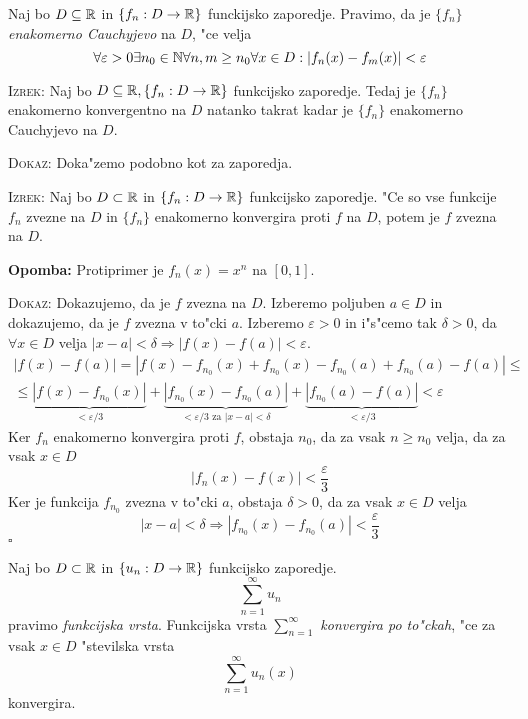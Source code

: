  Naj bo $D \subseteq \mathbb{R}$ in $\{ f_n : D \to \mathbb{R} \}$ funckijsko zaporedje. Pravimo, da je $\{ f_n \}$ \emph{enakomerno Cauchyjevo} na $D$, "ce velja
\begin{equation*}
\forall \varepsilon > 0 \exists n_0 \in \mathbb{N} \forall n, m \geq n_0 \forall x \in D : |f_n(x) - f_m(x)| < \varepsilon
\end{equation*}

\textsc{Izrek:} Naj bo $D \subseteq \mathbb{R}, \{f_n : D \to \mathbb{R} \}$ funkcijsko zaporedje. Tedaj je $\{ f_n \}$ enakomerno konvergentno na $D$ natanko takrat kadar je $\{ f_n \}$ enakomerno Cauchyjevo na $D$.

\textsc{Dokaz:} Doka"zemo podobno kot za zaporedja.

\textsc{Izrek:} Naj bo $D \subset \mathbb{R}$ in $\{ f_n : D \to \mathbb{R} \}$ funkcijsko zaporedje. "Ce so vse funkcije $f_n$ zvezne na $D$ in $\{ f_n \}$ enakomerno konvergira proti $f$ na $D$, potem je $f$ zvezna na $D$.

\textbf{Opomba:} Protiprimer je $f_n (x) = x^n$ na $[0, 1]$.

\textsc{Dokaz:} Dokazujemo, da je $f$ zvezna na $D$. Izberemo poljuben $a \in D$ in dokazujemo, da je $f$ zvezna v to"cki $a$. Izberemo $\varepsilon > 0$ in i"s"cemo tak $\delta > 0$, da $\forall x \in D$ velja $|x - a| < \delta \Rightarrow |f(x) - f(a)| < \varepsilon$.
\begin{multline*}
|f(x) - f(a)| = |f(x) - f_{n_0}(x) + f_{n_0}(x) - f_{n_0}(a) + f_{n_0}(a) - f(a)| \leq \\
\leq \underbrace{|f(x) - f_{n_0}(x)|}_{< \varepsilon/3} + \underbrace{|f_{n_0}(x) - f_{n_0}(a)|}_{< \varepsilon/3 \text{ za $|x - a| < \delta$}} + \underbrace{|f_{n_0}(a) - f(a)|}_{< \varepsilon/3} < \varepsilon
\end{multline*}
Ker $f_n$ enakomerno konvergira proti $f$, obstaja $n_0$, da za vsak $n \geq n_0$ velja, da za vsak $x \in D$
\begin{equation*}
|f_n(x) - f(x)| < \frac{\varepsilon}{3}
\end{equation*}
Ker je funkcija $f_{n_0}$ zvezna v to"cki $a$, obstaja $\delta > 0$, da za vsak $x \in D$ velja
\begin{equation*}
|x - a| < \delta \Rightarrow |f_{n_0}(x) - f_{n_0}(a)| < \dfrac{\varepsilon}{3}
\end{equation*}
\hfill $\square$

 Naj bo $D \subset \mathbb{R}$ in $\{ u_n : D \to \mathbb{R} \}$ funkcijsko zaporedje.
\begin{equation*}
\sum_{n=1}^{\infty} u_n
\end{equation*}
pravimo \emph{funkcijska vrsta}. Funkcijska vrsta $\sum_{n=1}^\infty$ \emph{konvergira po to"ckah}, "ce za vsak $x \in D$ "stevilska vrsta
\begin{equation*}
\sum_{n=1}^\infty u_n(x)
\end{equation*}
konvergira.

